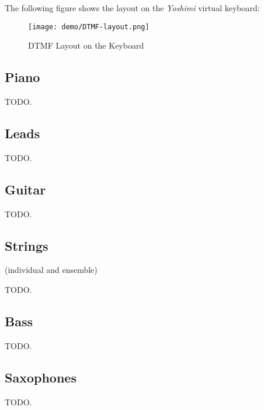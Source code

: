    The following figure shows the layout on the \textsl{Yoshimi} virtual
   keyboard:

\begin{figure}[H]
   \centering 
   \texttt{[image: demo/DTMF-layout.png]}
   \caption{DTMF Layout on the Keyboard}
   \label{fig:cookbook_instruments_DTMF_layout}
\end{figure}

\subsection{Piano}
\label{subsec:cookbook_instruments_piano}

   TODO.

\subsection{Leads}
\label{subsec:cookbook_instruments_leads}

   TODO.

\subsection{Guitar}
\label{subsec:cookbook_instruments_guitar}

   TODO.

\subsection{Strings} (individual and ensemble)
\label{subsec:cookbook_instruments_strings}

   TODO.

\subsection{Bass}
\label{subsec:cookbook_instruments_bass}

   TODO.

\subsection{Saxophones}
\label{subsec:cookbook_instruments_saxophones}

   TODO.

